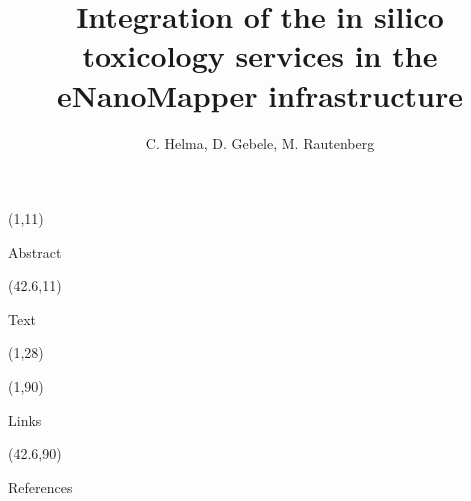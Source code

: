 \documentclass[final]{beamer}
\title{Integration of the in silico toxicology services in the eNanoMapper infrastructure }
\author{C. Helma, D. Gebele, M. Rautenberg}
\institute{\emph{in silico} toxicology gmbh, Basel, Switzerland}
\begin{document}
  \begin{frame}{}

    \begin{textblock}{40.5}(1,11)
      \begin{block}{Abstract}
        
      \end{block}

    \end{textblock}

    \begin{textblock}{40.5}(42.6,11)

      \begin{block}{Text}
        
      \end{block}

    \end{textblock}



    \begin{textblock}{82.1}(1,28)
      
    \end{textblock}

    \begin{textblock}{40.5}(1,90)

      \begin{exampleblock}{Links}
        
      \end{exampleblock}

    \end{textblock}

    \begin{textblock}{40.5}(42.6,90)

      \begin{block}{References}
        \small
      \end{block}

    \end{textblock}


  \end{frame}
\end{document}
